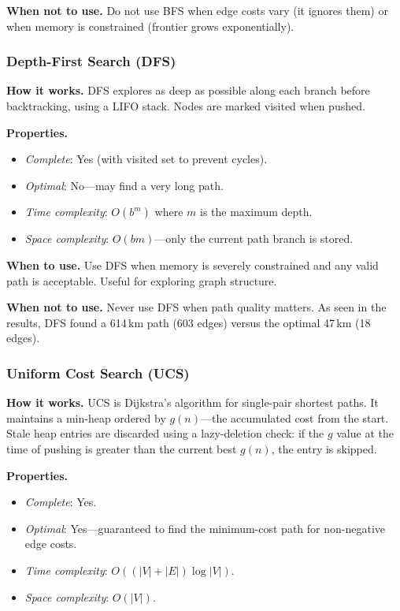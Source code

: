﻿\documentclass[a4paper, 12pt]{article}
\theoremstyle{remark}
\begin{document}
\textbf{When not to use.} Do not use BFS when edge costs vary (it ignores them) or when memory is constrained (frontier grows exponentially).

\subsubsection{Depth-First Search (DFS)}

\textbf{How it works.} DFS explores as deep as possible along each branch before backtracking, using a LIFO stack. Nodes are marked visited when pushed.

\textbf{Properties.}
\begin{itemize}
    \item \emph{Complete}: Yes (with visited set to prevent cycles).
    \item \emph{Optimal}: No---may find a very long path.
    \item \emph{Time complexity}: $O(b^m)$ where $m$ is the maximum depth.
    \item \emph{Space complexity}: $O(bm)$---only the current path branch is stored.
\end{itemize}

\textbf{When to use.} Use DFS when memory is severely constrained and any valid path is acceptable. Useful for exploring graph structure.

\textbf{When not to use.} Never use DFS when path quality matters. As seen in the results, DFS found a 614\,km path (603 edges) versus the optimal 47\,km (18 edges).

\subsubsection{Uniform Cost Search (UCS)}

\textbf{How it works.} UCS is Dijkstra's algorithm for single-pair shortest paths. It maintains a min-heap ordered by $g(n)$---the accumulated cost from the start. Stale heap entries are discarded using a lazy-deletion check: if the $g$ value at the time of pushing is greater than the current best $g(n)$, the entry is skipped.

\textbf{Properties.}
\begin{itemize}
    \item \emph{Complete}: Yes.
    \item \emph{Optimal}: Yes---guaranteed to find the minimum-cost path for non-negative edge costs.
    \item \emph{Time complexity}: $O((|V| + |E|) \log |V|)$.
    \item \emph{Space complexity}: $O(|V|)$.
\end{itemize}
\end{document}
